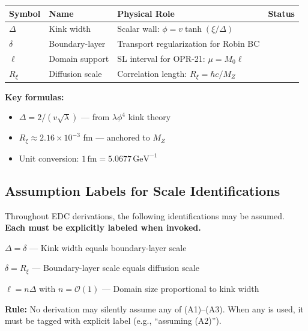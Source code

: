 \begin{tcolorbox}[colback=blue!3!white, colframe=blue!40!black,
    title=\textbf{EDC Scale Taxonomy — Canonical Table}]
\label{box:ch16_scale_taxonomy}

\begin{center}
\small
\renewcommand{\arraystretch}{1.3}
\begin{tabular}{@{}llp{6.5cm}c@{}}
\toprule
\textbf{Symbol} & \textbf{Name} & \textbf{Physical Role} & \textbf{Status} \\
\midrule
$\Delta$ & Kink width & Scalar wall: $\phi = v\tanh(\xi/\Delta)$ & \tagM{} \\
$\delta$ & Boundary-layer & Transport regularization for Robin BC & \tagP{} \\
$\ell$ & Domain support & SL interval for OPR-21: $\mu = M_0\ell$ & \tagP{} \\
$R_\xi$ & Diffusion scale & Correlation length: $R_\xi = \hbar c/M_Z$ & \tagBL{} \\
\bottomrule
\end{tabular}
\end{center}

\medskip
\textbf{Key formulas:}
\begin{itemize}[nosep]
    \item $\Delta = 2/(v\sqrt{\lambda})$ \tagM{} — from $\lambda\phi^4$ kink theory
    \item $R_\xi \approx 2.16 \times 10^{-3}$ fm \tagBL{} — anchored to $M_Z$
    \item Unit conversion: $1\,\mathrm{fm} = 5.0677\,\mathrm{GeV}^{-1}$
\end{itemize}
\end{tcolorbox}

\subsection{Assumption Labels for Scale Identifications}
\label{subsec:ch16_assumption_labels}

Throughout EDC derivations, the following identifications may be assumed.
\textbf{Each must be explicitly labeled when invoked.}

\begin{tcolorbox}[colback=yellow!5!white, colframe=orange!50!black,
    title=\textbf{Scale Identification Assumptions}]
\begin{description}[leftmargin=3em, style=nextline]
    \item[\textbf{(A1)}] $\Delta = \delta$ — Kink width equals boundary-layer scale
    \item[\textbf{(A2)}] $\delta = R_\xi$ — Boundary-layer scale equals diffusion scale
    \item[\textbf{(A3)}] $\ell = n\Delta$ with $n = \mathcal{O}(1)$ — Domain size proportional to kink width
\end{description}

\medskip
\textbf{Rule:} No derivation may silently assume any of (A1)--(A3). When any
is used, it must be tagged \tagP{} with explicit label (e.g., ``assuming (A2)'').
\end{tcolorbox}

